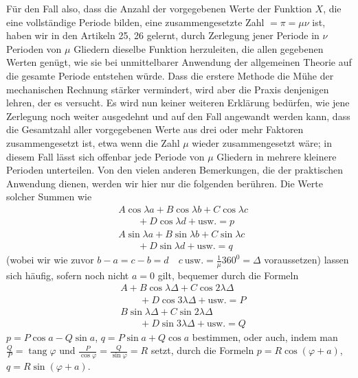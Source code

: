 \begingroup
\renewcommand{\arraystretch}{1.45}
Für den Fall also, dass die Anzahl der vorgegebenen Werte der Funktion $X$, die eine vollständige Periode bilden, eine zusammengesetzte Zahl $=\pi=\mu\nu$ ist, haben wir in den Artikeln 25, 26 gelernt, durch Zerlegung jener Periode in $\nu$ Perioden von $\mu$ Gliedern dieselbe Funktion herzuleiten, die allen gegebenen Werten genügt, wie sie bei unmittelbarer Anwendung der allgemeinen Theorie auf die gesamte Periode entstehen würde. Dass die erstere Methode die Mühe der mechanischen Rechnung stärker vermindert, wird aber die Praxis denjenigen lehren, der es versucht. Es wird nun keiner weiteren Erklärung bedürfen, wie jene Zerlegung noch weiter ausgedehnt und auf den Fall angewandt werden kann, dass die Gesamtzahl aller vorgegebenen Werte aus drei oder mehr Faktoren zusammengesetzt ist, etwa wenn die Zahl $\mu$
wieder zusammengesetzt wäre; in diesem Fall lässt sich offenbar jede Periode von $\mu$ Gliedern in mehrere kleinere Perioden unterteilen. Von den vielen anderen Bemerkungen, die der praktischen Anwendung dienen, werden wir hier nur die folgenden berühren. Die Werte solcher Summen wie
\[
\begin{aligned}
&A\cos\lambda a+B\cos\lambda b+C\cos\lambda c\\[5pt]
&\qquad{}+D\cos\lambda d+\text{usw.}=p\\[5pt]
&A\sin\lambda a+B\sin\lambda b+C\sin\lambda c\\[5pt]
&\qquad{}+D\sin\lambda d+\text{usw.}=q
\end{aligned}
\]
(wobei wir wie zuvor $b-a=c-b=d\quad c\ \text{usw.}=\tfrac1\mu360^{\mathord{0}}=\Delta$ voraussetzen)
lassen sich häufig, sofern noch nicht $a=0$ gilt, bequemer durch die Formeln
\[
\begin{aligned}
&A+B\cos\lambda\Delta+C\cos2\lambda\Delta\\[5pt]
&\qquad{}+D\cos3\lambda\Delta+\text{usw.}=P\\[5pt]
&B\sin\lambda\Delta+C\sin2\lambda\Delta\\[5pt]
&\qquad{}+D\sin3\lambda\Delta+\text{usw.}=Q
\end{aligned}
\]
$p=P\cos a-Q\sin a$, $q=P\sin a+Q\cos a$ bestimmen, oder auch, indem man
$\frac QP=\operatorname{tang}\varphi$ und $\frac P{\cos\varphi}=\frac Q{\sin\varphi}=R$ setzt,
durch die Formeln $p=R\cos(\varphi+a)$, $q=R\sin(\varphi+a)$.

\endgroup
